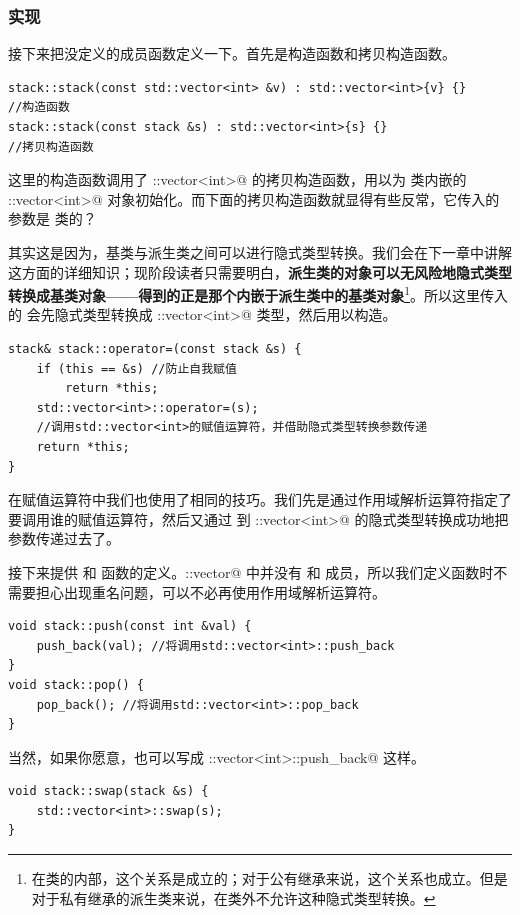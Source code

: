 \subsubsection*{实现}
接下来把没定义的成员函数定义一下。首先是构造函数和拷贝构造函数。
\begin{lstlisting}
stack::stack(const std::vector<int> &v) : std::vector<int>{v} {}
//构造函数
stack::stack(const stack &s) : std::vector<int>{s} {}
//拷贝构造函数
\end{lstlisting}
这里的构造函数调用了 \lstinline@std::vector<int>@ 的拷贝构造函数，用以为 \lstinline@stack@ 类内嵌的 \lstinline@std::vector<int>@ 对象初始化。而下面的拷贝构造函数就显得有些反常，它传入的参数是 \lstinline@stack@ 类的？\par
其实这是因为，基类与派生类之间可以进行隐式类型转换。我们会在下一章中讲解这方面的详细知识；现阶段读者只需要明白，\textbf{派生类的对象可以无风险地隐式类型转换成基类对象——得到的正是那个内嵌于派生类中的基类对象}\footnote{在类的内部，这个关系是成立的；对于公有继承来说，这个关系也成立。但是对于私有继承的派生类来说，在类外不允许这种隐式类型转换。}。所以这里传入的 \lstinline@s@ 会先隐式类型转换成 \lstinline@std::vector<int>@ 类型，然后用以构造。\par
\begin{lstlisting}
stack& stack::operator=(const stack &s) {
    if (this == &s) //防止自我赋值
        return *this;
    std::vector<int>::operator=(s);
    //调用std::vector<int>的赋值运算符，并借助隐式类型转换参数传递
    return *this;
}
\end{lstlisting}
在赋值运算符中我们也使用了相同的技巧。我们先是通过作用域解析运算符指定了要调用谁的赋值运算符，然后又通过 \lstinline@stack@ 到 \lstinline@std::vector<int>@ 的隐式类型转换成功地把参数传递过去了。\par
接下来提供 \lstinline@push@ 和 \lstinline@pop@ 函数的定义。\lstinline@std::vector@ 中并没有 \lstinline@push@ 和 \lstinline@pop@ 成员，所以我们定义函数时不需要担心出现重名问题，可以不必再使用作用域解析运算符。
\begin{lstlisting}
void stack::push(const int &val) {
    push_back(val); //将调用std::vector<int>::push_back
}
void stack::pop() {
    pop_back(); //将调用std::vector<int>::pop_back
}
\end{lstlisting}
当然，如果你愿意，也可以写成 \lstinline@std::vector<int>::push_back@ 这样。\par
\begin{lstlisting}
void stack::swap(stack &s) {
    std::vector<int>::swap(s);
}
\end{lstlisting}
